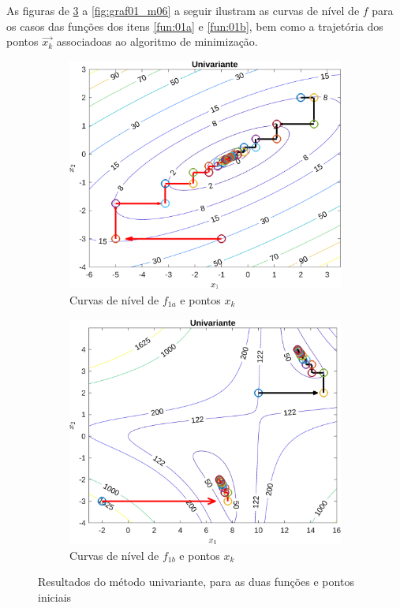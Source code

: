 \documentclass[10pt, a4paper]{article}
\begin{document}
As figuras de \ref{fig:graf01_m01} a \ref{fig:graf01_m06} a seguir ilustram as curvas de n\'ivel de $f$ para os casos das fun\c c\~oes dos itens \ref{fun:01a} e \ref{fun:01b}, bem como a trajet\'oria dos pontos $\vec{x_{k}}$ associadoas ao algoritmo de minimiza\c c\~ao.

\begin{figure}[H]
      \centering
      \begin{subfigure}{0.45\textwidth}
            \includegraphics[width=\textwidth]{img01A_m01.png}
            \caption{Curvas de n\'ivel de $f_{1a}$ e pontos $x_{k}$}
            \label{fig:graf01A_m01}
      \end{subfigure}
      \begin{subfigure}{0.45\textwidth}
            \centering
            \includegraphics[width=\textwidth]{img01B_m01.png}
            \caption{Curvas de n\'ivel de $f_{1b}$ e pontos $x_{k}$}
            \label{fig:graf01B_m01}
      \end{subfigure}
      \caption{Resultados do m\'etodo univariante, para as duas fun\c c\~oes e pontos iniciais}
      \label{fig:graf01_m01}
\end{figure}
\end{document}
